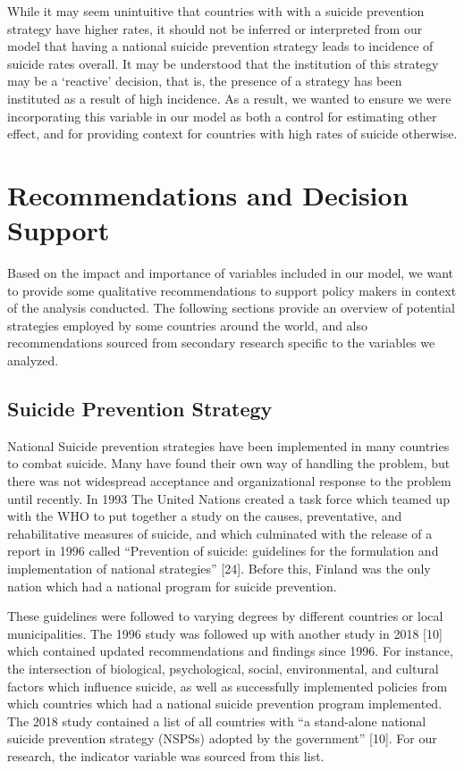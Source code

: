 \documentclass[]{article}
\begin{document}
While it may seem unintuitive that countries with with a suicide
prevention strategy have higher rates, it should not be inferred or
interpreted from our model that having a national suicide prevention
strategy leads to incidence of suicide rates overall. It may be
understood that the institution of this strategy may be a `reactive'
decision, that is, the presence of a strategy has been instituted as a
result of high incidence. As a result, we wanted to ensure we were
incorporating this variable in our model as both a control for
estimating other effect, and for providing context for countries with
high rates of suicide otherwise.

\section{Recommendations and Decision
Support}\label{recommendations-and-decision-support}

Based on the impact and importance of variables included in our model,
we want to provide some qualitative recommendations to support policy
makers in context of the analysis conducted. The following sections
provide an overview of potential strategies employed by some countries
around the world, and also recommendations sourced from secondary
research specific to the variables we analyzed.

\subsection{Suicide Prevention
Strategy}\label{suicide-prevention-strategy}

National Suicide prevention strategies have been implemented in many
countries to combat suicide. Many have found their own way of handling
the problem, but there was not widespread acceptance and organizational
response to the problem until recently. In 1993 The United Nations
created a task force which teamed up with the WHO to put together a
study on the causes, preventative, and rehabilitative measures of
suicide, and which culminated with the release of a report in 1996
called ``Prevention of suicide: guidelines for the formulation and
implementation of national strategies'' {[}24{]}. Before this, Finland
was the only nation which had a national program for suicide prevention.

These guidelines were followed to varying degrees by different countries
or local municipalities. The 1996 study was followed up with another
study in 2018 {[}10{]} which contained updated recommendations and
findings since 1996. For instance, the intersection of biological,
psychological, social, environmental, and cultural factors which
influence suicide, as well as successfully implemented policies from
which countries which had a national suicide prevention program
implemented. The 2018 study contained a list of all countries with ``a
stand-alone national suicide prevention strategy (NSPSs) adopted by the
government'' {[}10{]}. For our research, the indicator variable was
sourced from this list.
\end{document}
